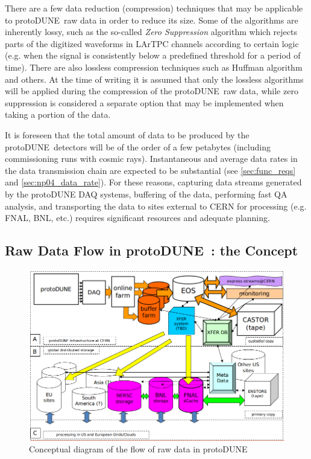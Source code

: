 \documentclass[pdftex,12pt,letter]{article}
\newcommand{\pd}{protoDUNE\ }
\begin{document}
There are a few data reduction (compression) techniques that may be applicable to \pd raw data in order to reduce its size. Some of the algorithms
are inherently lossy, such as the so-called \textit{Zero Suppression} algorithm which rejects parts of the digitized waveforms in LArTPC channels according
to certain logic (e.g. when the signal is consistently below a predefined threshold for a period of time). There are also lossless compression
techniques such as Huffman algorithm and others. At the time of writing it is assumed that only the lossless algorithms will be applied
during the compression
of the \pd raw data, while zero suppression is considered a separate option that may be implemented when taking a portion of the data.

It is foreseen that the total amount of data to be produced by the \pd detectors will be of the order of a few
petabytes (including commissioning runs with cosmic rays). Instantaneous and average data rates in the data transmission chain are expected to be
substantial (see \ref{sec:func_reqs} and \ref{sec:np04_data_rate}).
For these reasons, capturing data streams generated by the protoDUNE DAQ systems, buffering of the data, performing fast QA analysis,
and transporting the data to sites external to CERN for processing (e.g. FNAL, BNL, etc.) requires significant resources and adequate planning.

\subsection{Raw Data Flow in \pd: the Concept}
\label{sec:raw_concept}
\begin{figure}[tbh]
\centering\includegraphics[width=\linewidth]{figures/protoDUNE_raw_data_concept.png}
\caption{\label{fig:raw_concept}Conceptual diagram of the flow of raw data in \pd}
\end{figure}
\end{document}
